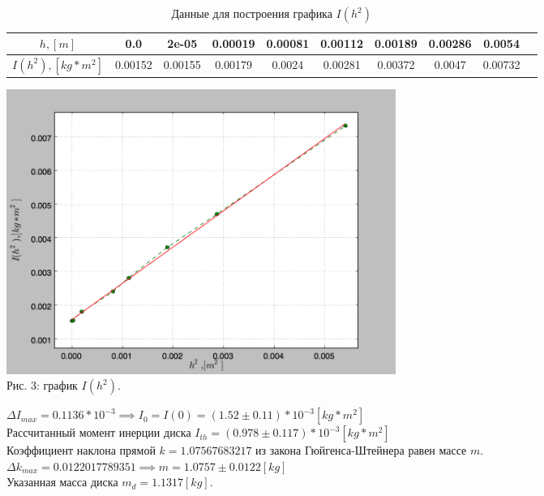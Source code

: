 \documentclass[12pt]{article}
\begin{document}
\begin{enumerate}
\begin{enumerate}
                    \begin{table}[h]
                        \caption{Данные для построения графика $I(h^2)$}
                        \begin{center}
                        \begin{tabular}{|c|c|c|c|c|c|c|c|c|c|}
                            \hline 
                                $h , [m]$ & 0.0 & 2e-05 & 0.00019 & 0.00081 & 0.00112 & 0.00189 & 0.00286 & 0.0054 \\
                            \hline
                                $I(h^2) , [kg * m^2]$ & 0.00152 & 0.00155 & 0.00179 & 0.0024 & 0.00281 & 0.00372 & 0.0047 & 0.00732 \\
                            \hline
                            \end{tabular}
                        \end{center}
                    \end{table}
            \end{enumerate}
            \begin{center} 
                \includegraphics[width=5in]{plot.png} \\ Рис. 3: график $I(h^2)$.
            \end{center}
                $\Delta I_{max} = 0.1136 * 10^{-3} \implies I_0 = I(0) = (1.52 \pm 0.11) * 10 ^ {-3} [kg * m^2]$ \\
                Рассчитанный момент инерции диска $ I_{th} = (0.978 \pm 0.117) * 10^{-3} [kg * m^2] $ \\ 

                Коэффициент наклона прямой $k = 1.07567683217$ из закона Гюйгенса-Штейнера равен массе $m$. \\  
                $\Delta k_{max} = 0.0122017789351 \implies m = 1.0757  \pm 0.0122 [kg]$ \\
                Указанная масса диска $m_{d} = 1.1317 [kg]$.



    \end{enumerate}     
\end{document}
